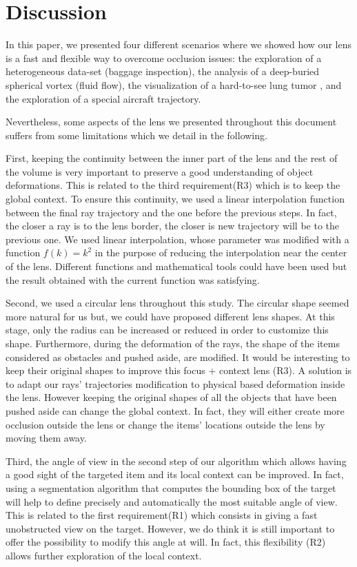 \section{Discussion}
In this paper, we presented four different scenarios where we showed how our lens is a fast and flexible way to overcome occlusion issues: the exploration of a heterogeneous data-set (baggage inspection), the analysis of a deep-buried spherical vortex (fluid flow), the visualization of a hard-to-see lung tumor , and the exploration of a special aircraft trajectory.    

Nevertheless, some aspects of the lens we presented throughout this document suffers from some limitations which we detail in the following. 


First, keeping the continuity between the inner part of the lens and the rest of the volume is very important to preserve a good understanding of object deformations. This is related to the third requirement(R3) which is to keep the global context. To ensure this continuity, we used a linear interpolation function between the final ray trajectory and the one before the previous steps. In fact, the closer a ray is to the lens border, the closer is new trajectory will be to the previous one. We used linear interpolation, whose parameter was modified with a function $ f\left(k\right) = k^2$ in the purpose of reducing the interpolation near the center of the lens. Different functions and mathematical tools could have been used but the result obtained with the current function was satisfying. 

Second, we used a circular lens throughout this study. The circular shape seemed more natural for us but, we could have proposed different lens shapes. At this stage, only the radius can be increased or reduced in order to customize this shape. Furthermore, during the deformation of the rays, the shape of the items considered as obstacles and pushed aside, are modified. It would be interesting to keep their original shapes to improve this focus + context lens (R3). A solution is to adapt our rays' trajectories modification to physical based deformation inside the lens. However keeping the original shapes of all the objects that have been pushed aside can change the global context. In fact, they will either create more occlusion outside the lens or change the items' locations outside the lens by moving them away.  


Third, the angle of view in the second step of our algorithm which allows having a good sight of the targeted item and its local context can be improved. In fact, using a segmentation algorithm that computes the bounding box of the target will help to define precisely and automatically the most suitable angle of view. This is related to the first requirement(R1) which consists in giving a fast unobstructed view on the target. However, we do think it is still important to offer the possibility to modify this angle at will. In fact, this flexibility (R2) allows further exploration of the local context.

